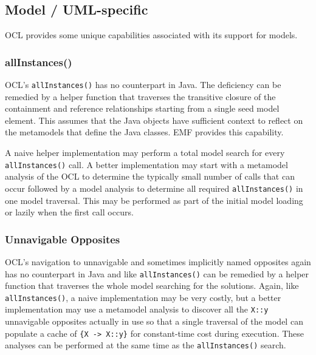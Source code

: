 \documentclass[sigconf]{acmart}
\begin{document}
\subsection{Model / UML-specific}

OCL provides some unique capabilities associated with its support for models.

\subsubsection{allInstances()}

OCL's \texttt{allInstances()} has no counterpart in Java. The deficiency can be remedied by a helper function that traverses the transitive closure of the containment and reference relationships starting from a single seed model element. This assumes that the Java objects have sufficient context to reflect on the metamodels that define the Java classes. EMF provides this capability.



A naive helper implementation may perform a total model search for every \texttt{allInstances()} call. A better implementation may start with a metamodel analysis of the OCL to determine the typically small number of calls that can occur followed by a model analysis to determine all required \texttt{allInstances()} in one model traversal. This may be performed as part of the initial model loading or lazily when the first call occurs.

\subsubsection{Unnavigable Opposites}\label{Implicit Opposites}

OCL's navigation to unnavigable and sometimes implicitly named opposites again has no counterpart in Java and like \texttt{allInstances()} can be remedied by a helper function that traverses the whole model searching for the solutions. Again, like \texttt{allInstances()}, a naive implementation may be very costly, but a better implementation may use a metamodel analysis to discover all the \verb|X::y| unnavigable opposites actually in use so that a single traversal of the model can populate a cache of \verb|{X -> X::y}| for constant-time cost during execution. These analyses can be performed at the same time as the \texttt{allInstances()} search.
\end{document}
